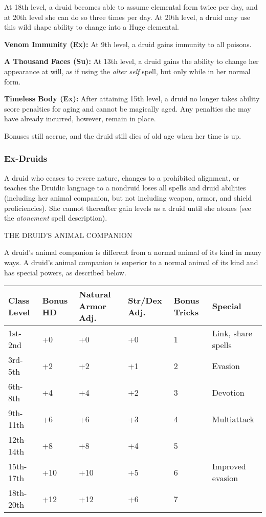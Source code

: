 \documentclass{article}
\begin{document}
At 18th level, a druid becomes able to assume elemental form twice per day, and 
at 20th level she can do so three times per day. At 20th level, a druid may use 
this wild shape ability to change into a Huge elemental.

\textbf{Venom Immunity (Ex):} At 9th level, a druid gains immunity to all poisons. 

\textbf{A Thousand Faces (Su):} At 13th level, a druid gains the ability to change 
her appearance at will, as if using the \textit{alter self }spell, but only while 
in her normal form.

\textbf{Timeless Body (Ex):} After attaining 15th level, a druid no longer takes 
ability score penalties for aging and cannot be magically aged. Any penalties she 
may have already incurred, however, remain in place.

Bonuses still accrue, and the druid still dies of old age when her time is up.

\vspace{12pt}
\subsubsection*{\textbf{Ex-Druids}}

A druid who ceases to revere nature, changes to a prohibited alignment, or teaches 
the Druidic language to a nondruid loses all spells and druid abilities (including 
her animal companion, but not including weapon, armor, and shield proficiencies). 
She cannot thereafter gain levels as a druid until she atones (see the \textit{atonement 
}spell description).

\vspace{12pt}
THE DRUID'S ANIMAL COMPANION

A druid's animal companion is different from a normal animal of its kind in many 
ways. A druid's animal companion is superior to a normal animal of its kind and 
has special powers, as described below.

\vspace{12pt}
\begin{tabular}{|>{\raggedright}p{38pt}|>{\raggedright}p{33pt}|>{\raggedright}p{66pt}|>{\raggedright}p{41pt}|>{\raggedright}p{43pt}|>{\raggedright}p{55pt}|}
\hline
C\textbf{lass Level } & B\textbf{onus HD } & N\textbf{atural Armor Adj. } & S\textbf{tr/Dex 
Adj.} & B\textbf{onus Tricks } & S\textbf{pecial}\tabularnewline
\hline
1st-2nd  & \centering +0 & +0 & +0 & 1 & Link, share spells\tabularnewline
\hline
3rd-5th  & \centering +2 & +2 & +1 & 2 & Evasion\tabularnewline
\hline
6th-8th  & \centering +4 & +4 & +2 & 3 & Devotion\tabularnewline
\hline
9th-11th  & \centering +6 & +6 & +3 & 4 & Multiattack\tabularnewline
\hline
12th-14th  & \centering +8 & +8 & +4 & 5 & \tabularnewline
\hline
15th-17th  & \centering +10 & +10 & +5 & 6 & Improved evasion\tabularnewline
\hline
18th-20th  & \centering +12 & +12 & +6 & 7 & \tabularnewline
\hline
\end{tabular}
\end{document}
